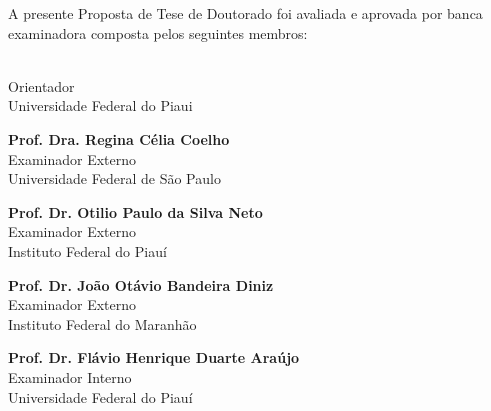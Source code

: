 \documentclass[
12pt,				%
oneside,			%
a4paper,			%
english,			%
french,				%
spanish,			%
brazil				%
]{abntex2}
\newcommand{\alinhadoesq}[1]{\noindent\begin{minipage}[top]{\textwidth}#1\end{minipage}}
\newcommand{\alinhadodir}[1]{\alinhadoesq{\begin{flushright}#1\end{flushright}}}
\newcommand{\myyear}{}
\newcommand{\mymonth}{}
\newcommand{\myday}{}
\begin{document}
		
		
		
		\begin{folhadeaprovacao}
			
			\alinhadodir{ \large\imprimirautor}
			
			\vspace*{\fill}
			\alinhadodir{ \bfseries\Large\imprimirtitulo}
			\vspace*{\fill}
			
			\hspace{.15\textwidth}
			\begin{minipage}{.75\textwidth}
				A presente Proposta de Tese de Doutorado foi avaliada e aprovada por banca examinadora composta pelos seguintes membros: 
			\end{minipage} 
			
			\vspace{0.01\textwidth} 
			
			\alinhadodir{ \textbf{\imprimirorientador} \\ Orientador\\ Universidade Federal do Piaui }
			
			\vspace{0.01\textwidth} 
			\alinhadodir{\textbf{Prof. Dra. Regina Célia Coelho} \\ Examinador Externo\\ Universidade Federal de São Paulo}
			
			\vspace{0.01\textwidth} 
			\alinhadodir{\textbf{Prof. Dr. Otilio Paulo da Silva Neto} \\ Examinador Externo\\ Instituto Federal do Piauí}
			
			\vspace{0.01\textwidth} 
			\alinhadodir{\textbf{Prof. Dr. João Otávio Bandeira Diniz} \\ Examinador Externo \\ Instituto Federal do Maranhão}
			
			\vspace{0.01\textwidth} 
			\alinhadodir{\textbf{Prof. Dr. Flávio Henrique Duarte Araújo} \\ Examinador Interno \\ Universidade Federal do Piauí}
			

\end{folhadeaprovacao}
\end{document}
